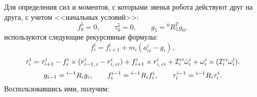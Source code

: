 Для определения сил и моментов, с которыми звенья робота действуют друг на друга, с учетом <<начальных условий>>:
\begin{equation}
    f^5_6=0, \qquad \tau^5_6=0, \qquad g_5= {}^0R_5^T g_0,
\end{equation}
используются следующие рекурсивные формулы:
\begin{equation}
    f^i_i = f^i_{i+1} + m_i(a^i_{ci} - g_i),
\end{equation}
\begin{equation}
    \tau^i_i = \tau^i_{i+1} - f^i_i\times(r^i_{i-1,\,i} - r^i_{i,\,ci}) + f^i_{i+1} \times r^i_{i,\,ci} + \mathcal{I}^{ci}_i\dot\omega^i_i + \omega_i^i\times(\mathcal{I}^{ci}_i\omega_i^i)\ldotp
\end{equation}
\begin{equation}
    g_{i-1} = {}^{i-1}R_ig_i,
    \qquad
    f^{i-1}_i = {}^{i-1}R_{i}f^{i}_{i},
    \qquad
    \tau^{i-1}_{i} = {}^{i-1}R_{i}\tau^{i}_{i}\ldotp
\end{equation}
Воспользовавшись ими, получим:
